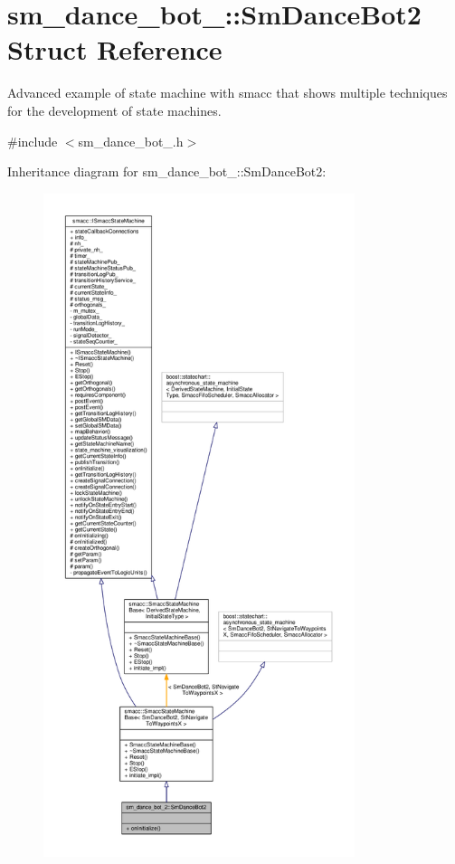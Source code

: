 \hypertarget{structsm__dance__bot__2_1_1SmDanceBot2}{}\section{sm\+\_\+dance\+\_\+bot\+\_\+:\+:Sm\+Dance\+Bot2 Struct Reference}
\label{structsm__dance__bot__2_1_1SmDanceBot2}


Advanced example of state machine with smacc that shows multiple techniques for the development of state machines.  




{\ttfamily \#include $<$sm\+\_\+dance\+\_\+bot\+\_.\+h$>$}



Inheritance diagram for sm\+\_\+dance\+\_\+bot\+\_\+:\+:Sm\+Dance\+Bot2\+:\nopagebreak
\begin{figure}[H]
\begin{center}
\leavevmode
\includegraphics[height=550pt]{structsm__dance__bot__2_1_1SmDanceBot2__inherit__graph}
\end{center}
\end{figure}


